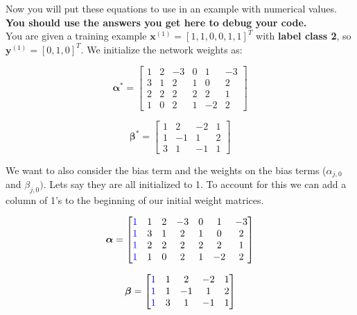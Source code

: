 \documentclass[11pt,addpoints,answers]{exam}
\newcommand{\xv}{\mathbf{x}}
\newcommand{\yv}{\mathbf{y}}
\newcommand{\alphav     }{\boldsymbol \alpha     }
\begin{document}
\begin{questions}
\begin{parts}
    \begin{your_solution}[title=$\partial \ell/\partial \alphav$,height=6cm,width=15cm]
    \end{your_solution}
    
\end{parts}



\clearpage    

\question Now you will put these equations to use in an example with numerical values. \textbf{You should use the answers you get here to debug your code.} \\
You are given a training example $\xv^{(1)}=[1,1,0,0,1,1]^T$ with \textbf{label class 2}, so $\yv^{(1)}=[0,1,0]^T$. We initialize the network weights as:
\begin{center}
$$\boldsymbol{\alpha^*}=
    \begin{bmatrix}
    1 & 2 & -3 & 0 & 1 & -3 \\
    3 & 1 & 2 & 1 & 0 & 2 \\
    2 & 2 & 2 & 2 & 2 & 1 \\
    1 & 0 & 2 & 1 & -2 & 2
    \end{bmatrix}$$
    
$$\boldsymbol{\beta^*}=
    \begin{bmatrix}
    1 & 2 & -2 & 1 \\
    1 & -1 & 1 & 2 \\
    3 & 1 & -1 & 1
    \end{bmatrix}
$$
\end{center}
    
We want to also consider the bias term and the weights on the bias terms (${\alpha}_{j,0}$ and ${\beta}_{j,0})$. Lets say they are all initialized to 1. To account for this we can add a column of 1's to the beginning of our initial weight matrices. 

$$\boldsymbol{\alpha}=
    \begin{bmatrix}
    \textcolor{blue}{1} & 1 & 2 & -3 & 0 & 1 & -3 \\
    \textcolor{blue}{1} & 3 & 1 & 2 & 1 & 0 & 2 \\
    \textcolor{blue}{1} & 2 & 2 & 2 & 2 & 2 & 1 \\
    \textcolor{blue}{1} & 1 & 0 & 2 & 1 & -2 & 2
    \end{bmatrix}$$
    
$$\boldsymbol{\beta}=
    \begin{bmatrix}
    \textcolor{blue}{1} & 1 & 2 & -2 & 1 \\
    \textcolor{blue}{1} & 1 & -1 & 1 & 2 \\
    \textcolor{blue}{1} & 3 & 1 & -1 & 1
    \end{bmatrix}
$$


\end{questions}
\end{document}
